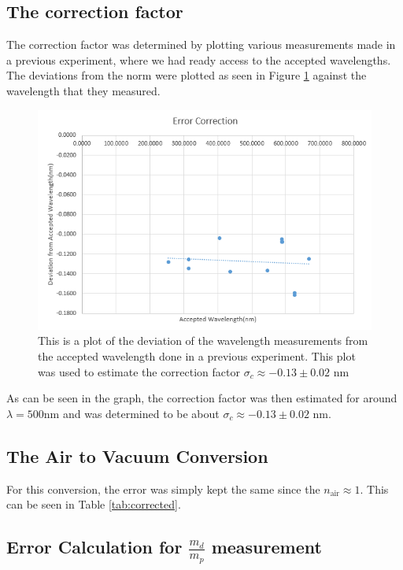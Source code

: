 \documentclass[%
 aps,%
 pra,%
 preprint, %
 amsmath, %
 amsfonts, %
 amssymb, %
]{revtex4-2}
\begin{document}
\subsection{The correction factor}
The correction factor was determined by plotting various measurements made in a previous experiment, where we had ready access to the accepted wavelengths. The deviations from the norm were plotted as seen in Figure \ref{fig:correction} against the wavelength that they measured. 


\begin{figure}[h!]
  \includegraphics[width=\linewidth]{Figures/Correction.PNG}
  \caption{This is a plot of the deviation of the wavelength measurements from the accepted wavelength done in a previous experiment. This plot was used to estimate the correction factor $\sigma_c \approx -0.13 \pm 0.02$ nm}
  \label{fig:correction}
\end{figure}
\newpage




As can be seen in the graph, the correction factor was then estimated for around $\lambda=500$nm and was determined to be about $\sigma_c \approx -0.13 \pm 0.02$ nm.


\subsection{The Air to Vacuum Conversion}
For this conversion, the error was simply kept the same since the $n_{\text{air}} \approx 1$. This can be seen in Table \ref{tab:corrected}.

\subsection{Error Calculation for $\frac{m_d}{m_p}$ measurement}
\end{document}
